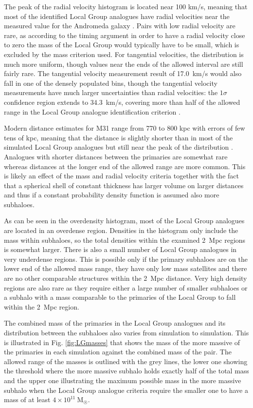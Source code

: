 \documentclass[english, twoside]{HYgradu}
\begin{document}
The peak of the radial velocity histogram is located near 100 km/s, meaning that most of the identified Local Group analogues have radial velocities near the measured value for the Andromeda galaxy \citep{vandermarel2012m31}. Pairs with low radial velocity are rare, as according to the timing argument in order to have a radial velocity close to zero the mass of the Local Group would typically have to be small, which is excluded by the mass criterion used. For tangential velocities, the distribution is much more uniform, though values near the ends of the allowed interval are still fairly rare. The \citet{vandermarel2012m31} tangential velocity measurement result of 17.0~km/s would also fall in one of the densely populated bins, though the tangential velocity measurements have much larger uncertainties than radial velocities: the $1\sigma$ confidence region extends to 34.3~km/s, covering more than half of the allowed range in the Local Group analogue identification criterion \citep{vandermarel2012m31}.

Modern distance estimates for M31 range from 770 to 800 kpc with errors of few tens of kpc, meaning that the distance is slightly shorter than in most of the simulated Local Group analogues but still near the peak of the distribution \citep{mcconnachie2005distances}. Analogues with shorter distances between the primaries are somewhat rare whereas distances at the longer end of the allowed range are more common. This is likely an effect of the mass and radial velocity criteria together with the fact that a spherical shell of constant thickness has larger volume on larger distances and thus if a constant probability density function is assumed also more subhaloes.

As can be seen in the overdensity histogram, most of the Local Group analogues are located in an overdense region. Densities in the histogram only include the mass within subhaloes, so the total densities within the examined 2~Mpc regions is somewhat larger. There is also a small number of Local Group analogues in very underdense regions. This is possible only if the primary subhaloes are on the lower end of the allowed mass range, they have only low mass satellites and there are no other comparable structures within the 2~Mpc distance. Very high density regions are also rare as they require either a large number of smaller subhaloes or a subhalo with a mass comparable to the primaries of the Local Group to fall within the 2~Mpc region.

The combined mass of the primaries in the Local Group analogues and its distribution between the subhaloes also varies from simulation to simulation. This is illustrated in Fig. \ref{fig:LGmasses} that shows the mass of the more massive of the primaries in each simulation against the combined mass of the pair. The allowed range of the masses is outlined with the grey lines, the lower one showing the threshold where the more massive subhalo holds exactly half of the total mass and the upper one illustrating the maximum possible mass in the more massive subhalo when the Local Group analogue criteria require the smaller one to have a mass of at least $4 \times 10^{11}~\mathrm{M_{\astrosun}}$.
\end{document}

